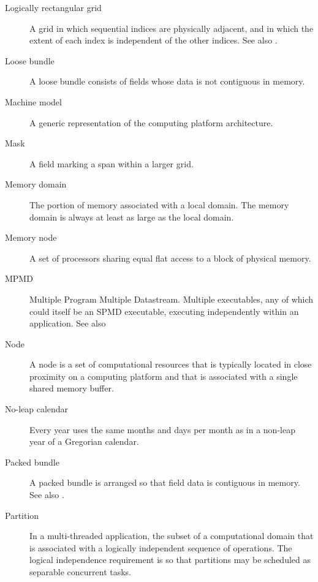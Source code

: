 \begin{description}
\item[Logically rectangular grid] \label{glos:RecGrid} A grid in 
  which sequential indices are physically adjacent, and in which the 
  extent of each index is independent of the other indices.
  See also .

\item[Loose bundle] \label{glos:LooseBundle} A loose bundle consists of 
  fields whose data is not contiguous in memory.

\item[Machine model] A generic representation of the computing 
  platform architecture.

\item[Mask] \label{glos:Mask} A field marking a span within a larger grid.

\item[Memory domain] \label{glos:MemDomain} The portion of memory 
  associated with a local domain.  The memory domain is always at least 
  as large as the local domain.

\item[Memory node] \label{glos:Mnode} A set of processors
  sharing equal flat access to a block of physical memory.

\item[MPMD] \label{glos:MPMD} Multiple Program Multiple Datastream.
  Multiple executables, any of which could itself be an SPMD
  executable, executing independently within an application. 
  See also 

\item[Node] \label{glos:Node} A node is a set of computational resources
  that is typically located in close proximity on a computing platform
  and that is associated with a single shared memory buffer.

\item [No-leap calendar] \label{glos:NoLeap} Every year uses the same months 
  and days per month as in a non-leap year of a Gregorian calendar.

\item[Packed bundle] \label{glos:PackedBundle} A packed bundle is arranged
  so that field data is contiguous in memory. See also .

\item[Partition] \label{glos:Partition} In a multi-threaded application, the subset of a
  computational domain that is associated with a logically independent
  sequence of operations. The logical independence requirement is so
  that partitions may be scheduled as separable concurrent tasks.


\end{description}
